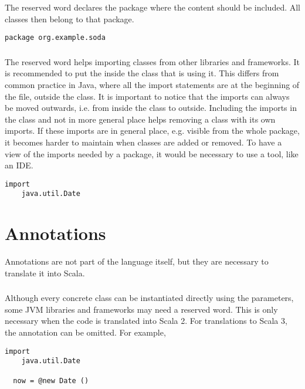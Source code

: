 The reserved word \sodapackage declares the package where the content should be included.
All classes then belong to that package.

\begin{lstlisting}[label={lst:examplePackage}]
package org.example.soda
\end{lstlisting}

\subsubsection{\sodaimport}

The reserved word \sodaimport helps importing classes from other libraries and frameworks.
It is recommended to put the \sodaimport inside the class that is using it.
This differs from common practice in Java, where all the import statements are at the beginning of the file, outside the class.
It is important to notice that the imports can always be moved outwards, i.e. from inside the class to outside.
Including the imports in the class and not in more general place helps removing a class with its own imports.
If these imports are in general place, e.g. visible from the whole package, it becomes harder to maintain when classes are added or removed.
To have a view of the imports needed by a package, it would be necessary to use a tool, like an IDE.


\begin{lstlisting}[label={lst:exampleImport}]
  import
    java.util.Date
\end{lstlisting}


\section{Annotations}

Annotations are not part of the language itself, but they are necessary to translate it into Scala.

\subsubsection{\sodanew}

Although every concrete class can be instantiated directly using the parameters, some JVM libraries and frameworks may need a \sodanew reserved word.
This is only necessary when the code is translated into Scala 2.
For translations to Scala 3, the \sodanew annotation can be omitted.
For example,

\begin{lstlisting}[label={lst:exampleImportDate}]
  import
    java.util.Date

  now = @new Date ()
\end{lstlisting}

